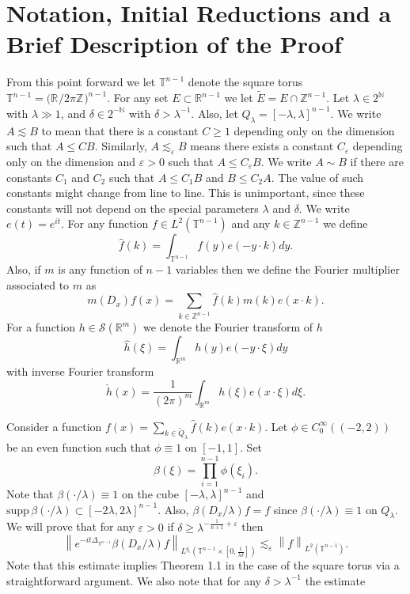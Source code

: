 \documentclass[11pt]{amsart}
\numberwithin{equation}{section}
\newcommand{\field}[1]{\mathbb{#1}}
\newcommand{\N}{\field{N}}
\newcommand{\Rn}{\mathbb{R}^{n-1}}
\newcommand{\Zn}{\mathbb{Z}^{n-1}}
\newcommand{\Tn}{\mathbb{T}^{n-1}}
\newcommand{\la}{\lambda}
\newcommand\norm[1]{\left\lVert#1\right\rVert}
\newcommand{\lpnorm}[3]{\norm{#1}_{L^{#2}(#3)}}
\newcommand{\supp}[1]{\text{supp}\, #1}
\newcommand{\R}[1][]{\mathbb{R}^#1}
\newcommand{\Z}[1][]{\mathbb{Z}^#1}
\newcommand{\laplac}[1]{\Delta_{#1}}
\begin{document}
\section{Notation, Initial Reductions and a Brief Description of the Proof}
From this point forward we let $\Tn$ denote the square torus $\Tn = \big(\R{} / 2\pi\Z{}\big)^{n-1}$. For any set $E \subset \Rn$ we let $\tilde{E} = E \cap \Zn$. Let $\la \in 2^{\N}$ with $\la \gg 1$, and $\delta \in 2^{-\N{}}$ with $\delta > \la^{-1}$. Also, let $Q_{\la} = [-\la, \la]^{n-1}$. We write $A \lesssim B$ to mean that there is a constant $C \geq 1$ depending only on the dimension such that $A \leq CB$. Similarly, $A \lesssim_{\varepsilon} B$ means there exists a constant $C_{\varepsilon}$ depending only on the dimension and $\varepsilon > 0$ such that $A \leq C_{\varepsilon}B$. We write $A \sim B$ if there are constants $C_1$ and $C_2$ such that $A \leq C_1 B$ and $B \leq C_2 A$. The value of such constants might change from line to line. This is unimportant, since these constants will not depend on the special parameters $\la$ and $\delta$. We write $e(t) = e^{it}$. For any function $f \in L^{2}(\Tn)$ and any $k \in \Zn$ we define 
\begin{equation}
    \widehat{f}(k) = \int_{\Tn}f(y)e(-y\cdot k)dy.
\end{equation}
Also, if $m$ is any function of $n-1$ variables then we define the Fourier multiplier associated to $m$ as
\begin{equation}
    m(D_x)f(x) = \sum_{k \in \Zn}\widehat{f}(k)m(k)e(x \cdot k).
\end{equation}
For a function $h \in \mathcal{S}(\R{m})$ we denote the Fourier transform of $h$
\begin{equation}
    \widehat{h}(\xi) = \int_{\R{m}}h(y)e(-y\cdot\xi)dy
\end{equation}
with inverse Fourier transform
\begin{equation}
    \check{h}(x) = \frac{1}{(2\pi)^m}\int_{\R{m}}h(\xi)e(x\cdot\xi)d\xi.
\end{equation}

Consider a function $f(x) = \sum_{k \in \tilde{Q}_{\la}}\widehat{f}(k)e(x\cdot k)$. Let $\phi \in C_{0}^{\infty}((-2,2))$ be an even function such that $\phi \equiv 1$ on $[-1,1]$. Set
\begin{equation}
    \beta(\xi) = \prod_{i = 1}^{n-1}\phi(\xi_i).
\end{equation}
Note that $\beta(\cdot / \la) \equiv 1$ on the cube $[-\la, \la]^{n-1}$ and $\supp{\beta(\cdot / \la)} \subset [-2\la, 2\la]^{n-1}$. Also, $\beta(D_x/\la)f = f$ since $\beta(\cdot / \la) \equiv 1$ on $Q_{\la}$. We will prove that for any $\varepsilon > 0$ if $\delta \geq \la^{-\frac{1}{n+1} +\varepsilon}$ then
\begin{equation}
    \lpnorm{e^{-it\laplac{\Tn}}\beta(D_x/\la)f}{q_c}{\Tn \times [0,\frac{1}{\la\delta}]} \lesssim_{\varepsilon}\lpnorm{f}{2}{\Tn}.
\end{equation}
Note that this estimate implies Theorem 1.1 in the case of the square torus via a straightforward argument. We also note that for any $\delta > \la^{-1}$ the estimate
\end{document}
